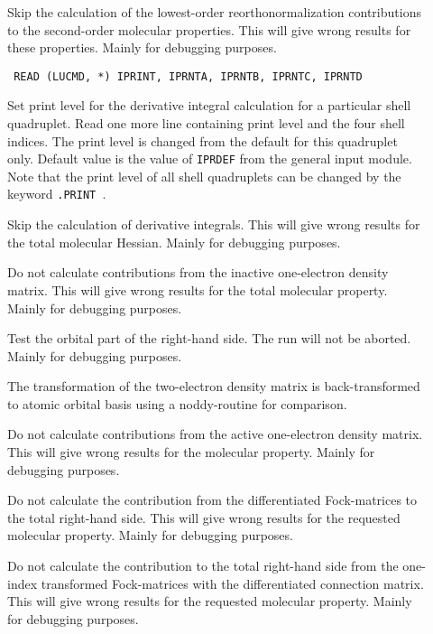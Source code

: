 \begin{description}
\item[] Skip the calculation of the lowest-order
reorthonormalization contributions to the second-order molecular
properties. This will give wrong results for these properties. Mainly
for debugging purposes.

\item[]\verb| |\newline
\verb|READ (LUCMD, *) IPRINT, IPRNTA, IPRNTB, IPRNTC, IPRNTD|

Set print level for the derivative integral calculation for a particular shell
quadruplet.  Read one more line containing print level and the four
shell indices.  The print level is changed from the default
for this quadruplet only. Default value is the value of \verb|IPRDEF|
from the general input module. Note that the print level of all shell
quadruplets can be changed by the keyword \verb|.PRINT |.

\item[] Skip the calculation of derivative integrals.
This will give wrong results for the total molecular Hessian. Mainly
for debugging purposes.

\item[] Do not calculate contributions from the inactive
one-electron density matrix. This will give wrong results for the
total molecular property. Mainly for debugging purposes.

\item[] Test the orbital part of the right-hand side.
The run will not be aborted. Mainly for debugging purposes.

\item[] The transformation of the two-electron density
matrix is back-transformed to atomic orbital basis using a
noddy-routine for comparison.

\item[] Do not calculate contributions from the active
one-electron density matrix. This will give wrong results for the
molecular property. Mainly for debugging purposes.

\item[] Do not calculate the contribution from the
differentiated Fock-matrices to the total right-hand side. This will
give wrong results for the requested molecular property. Mainly for
debugging purposes.

\item[] Do not calculate the contribution to the total
right-hand side from the one-index transformed Fock-matrices with the
differentiated connection matrix. This will give wrong results for
the requested molecular property. Mainly for debugging purposes.


\end{description}
